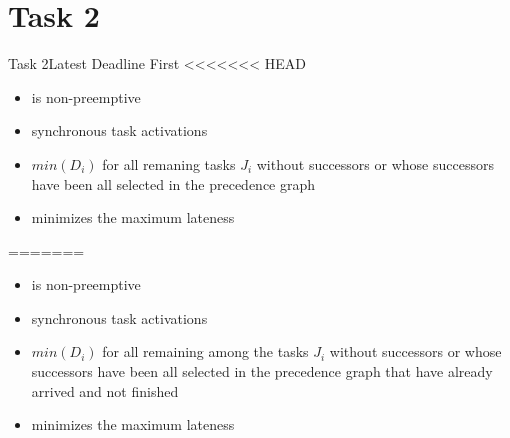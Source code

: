 
\section{Task 2}

\setcounter{task}{1}

\begin{frame}{Task 2}{Latest Deadline First}
<<<<<<< HEAD
  \begin{requirements}
    \begin{itemize}
      \item is \alert{non-preemptive}
      \item \alert{synchronous task activations}
      \item $min(D_i)$ for all remaning tasks $J_i$ \alert{without successors} or \alert{whose successors} have been all selected in the \alert{precedence graph}
      \item \alert{minimizes} the \alert{maximum lateness}
    \end{itemize}
  \end{requirements}
=======
  \begin{itemize}
    \item is \alert{non-preemptive}
    \item \alert{synchronous task activations}
    \item $min(D_i)$ for all remaining among the tasks $J_i$ without successors or whose successors have been all selected in the \alert{precedence graph} that have already \alert{arrived} and \alert{not finished}
    \item \alert{minimizes} the \alert{maximum lateness}
  \end{itemize}
\end{frame}


